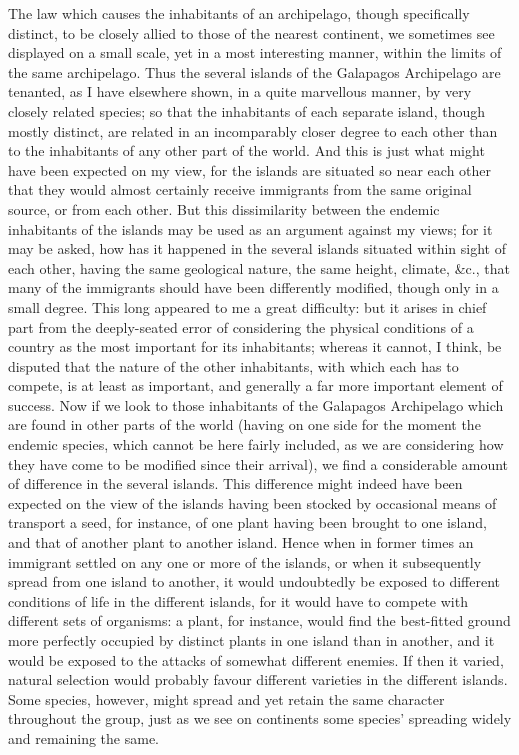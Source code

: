 \indent The law which causes the inhabitants of an archipelago, though specifically distinct, to be closely allied to those of the nearest continent, we sometimes see displayed on a small scale, yet in a most interesting manner, within the limits of the same archipelago. Thus the several islands of the Galapagos Archipelago are tenanted, as I have elsewhere shown, in a quite marvellous manner, by very closely related species; so that the inhabitants of each separate island, though mostly distinct, are related in an incomparably closer degree to each other than to the inhabitants of any other part of the world. And this is just what might have been expected on my view, for the islands are situated so near each other that they would almost certainly receive immigrants from the same original source, or from each other. But this dissimilarity between the endemic inhabitants of the islands may be used as an argument against my views; for it may be asked, how has it happened in the several islands situated within sight of each other, having the same geological nature, the same height, climate, \&c., that many of the immigrants should have been differently modified, though only in a small degree. This long appeared to me a great difficulty: but it arises in chief part from the deeply-seated error of considering the physical conditions of a country as the most important for its inhabitants; whereas it cannot, I think, be disputed that the nature of the other inhabitants, with which each has to compete, is at least as important, and generally a far more important element of success. Now if we look to those inhabitants of the Galapagos Archipelago which are found in other parts of the world (having on one side for the moment the endemic species, which cannot be here fairly included, as we are considering how they have come to be modified since their arrival), we find a considerable amount of difference in the several islands. This difference might indeed have been expected on the view of the islands having been stocked by occasional means of transport a seed, for instance, of one plant having been brought to one island, and that of another plant to another island. Hence when in former times an immigrant settled on any one or more of the islands, or when it subsequently spread from one island to another, it would undoubtedly be exposed to different conditions of life in the different islands, for it would have to compete with different sets of organisms: a plant, for instance, would find the best-fitted ground more perfectly occupied by distinct plants in one island than in another, and it would be exposed to the attacks of somewhat different enemies. If then it varied, natural selection would probably favour different varieties in the different islands. Some species, however, might spread and yet retain the same character throughout the group, just as we see on continents some species' spreading widely and remaining the same.~\\
